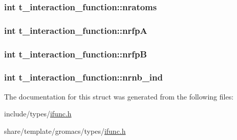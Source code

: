 \hypertarget{structt__interaction__function_adae5684d70e578d5e130265d972b00db}{
\subsubsection[{nratoms}]{\setlength{\rightskip}{0pt plus 5cm}int {\bf t\-\_\-interaction\-\_\-function\-::nratoms}}}\label{structt__interaction__function_adae5684d70e578d5e130265d972b00db}
\hypertarget{structt__interaction__function_a49bc601a9397dc7e953305e2afaec598}{
\subsubsection[{nrfp\-A}]{\setlength{\rightskip}{0pt plus 5cm}int {\bf t\-\_\-interaction\-\_\-function\-::nrfp\-A}}}\label{structt__interaction__function_a49bc601a9397dc7e953305e2afaec598}
\hypertarget{structt__interaction__function_a6e72f3e9baa6b2e39de38cfa3e0c5792}{
\subsubsection[{nrfp\-B}]{\setlength{\rightskip}{0pt plus 5cm}int {\bf t\-\_\-interaction\-\_\-function\-::nrfp\-B}}}\label{structt__interaction__function_a6e72f3e9baa6b2e39de38cfa3e0c5792}
\hypertarget{structt__interaction__function_a665285156e4b7e470201b361f6dc579a}{
\subsubsection[{nrnb\-\_\-ind}]{\setlength{\rightskip}{0pt plus 5cm}int {\bf t\-\_\-interaction\-\_\-function\-::nrnb\-\_\-ind}}}\label{structt__interaction__function_a665285156e4b7e470201b361f6dc579a}


\-The documentation for this struct was generated from the following files\-:\begin{DoxyCompactItemize}
\item 
include/types/\hyperlink{include_2types_2ifunc_8h}{ifunc.\-h}\item 
share/template/gromacs/types/\hyperlink{share_2template_2gromacs_2types_2ifunc_8h}{ifunc.\-h}\end{DoxyCompactItemize}
